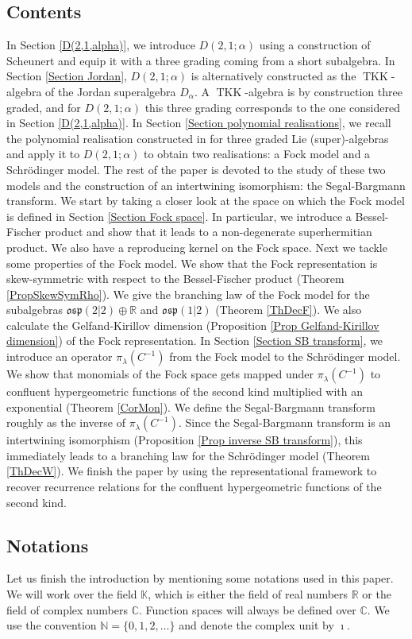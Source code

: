 \documentclass{amsart}
\numberwithin{theorem}{section}
\theoremstyle{definition}
\theoremstyle{remark}
\def\R{\mathds{R} }
\def\C{\mathds{C} }
\DeclareMathOperator{\TKK}{TKK}
\newcommand{\ds}[1]{\mathds{#1}}
\begin{document}
\subsection{Contents}
In Section \ref{D(2,1,alpha)}, we introduce $D(2,1;\alpha)$ using a construction of Scheunert and equip it with a three grading coming from a short subalgebra. In Section \ref{Section Jordan}, $D(2,1;\alpha)$ is alternatively constructed as the $\TKK$-algebra of the Jordan superalgebra $D_\alpha$. A $\TKK$-algebra is by construction three graded, and for $D(2,1;\alpha)$ this three grading corresponds to the one considered in Section \ref{D(2,1,alpha)}.  In Section \ref{Section polynomial realisations}, we recall the polynomial realisation constructed in \cite{BC1} for three graded Lie (super)-algebras and apply it to $D(2,1;\alpha)$ to obtain two realisations: a Fock model and a Schrödinger model. The rest of the paper is devoted to the study of these two models and the construction of an intertwining isomorphism: the Segal-Bargmann transform. We start by taking a closer look at the space on which the Fock model is defined in Section \ref{Section Fock space}. In particular, we introduce a Bessel-Fischer product and show that it leads to a non-degenerate superhermitian product. We also have a reproducing kernel on the Fock space. Next we tackle some properties of the Fock model. We show that the Fock representation is skew-symmetric with respect to the Bessel-Fischer product (Theorem \ref{PropSkewSymRho}). We give the branching law of the Fock model for the subalgebras $\mathfrak{osp}(2|2)\oplus \R$ and $\mathfrak{osp}(1|2)$ (Theorem \ref{ThDecF}). We also calculate the Gelfand-Kirillov dimension (Proposition \ref{Prop Gelfand-Kirillov dimension}) of the Fock representation.
In Section \ref{Section SB transform}, we introduce an operator $\pi_\lambda(C^{-1})$ from the Fock model to the Schrödinger model. We show that monomials of the Fock space gets mapped under $\pi_\lambda(C^{-1})$ to confluent hypergeometric functions of the second kind multiplied with an exponential (Theorem \ref{CorMon}).
We define the Segal-Bargmann transform roughly as the inverse of $\pi_\lambda(C^{-1})$. Since the Segal-Bargmann transform is an intertwining isomorphism (Proposition \ref{Prop inverse SB transform}), this immediately leads to a branching law for the Schrödinger model (Theorem \ref{ThDecW}).
We finish the paper by using the representational framework to recover recurrence relations for the confluent hypergeometric functions of the second kind.
\subsection{Notations}
Let us finish the introduction by mentioning some notations used in this paper. We will work over the field $\ds K$, which is either the field of real numbers $\ds R$ or the field of complex numbers $\ds C$. Function spaces will always be defined over $\C$. We use the convention $\ds N = \{0,1,2,\ldots\}$ and denote the complex unit by $\imath$.
\end{document}
